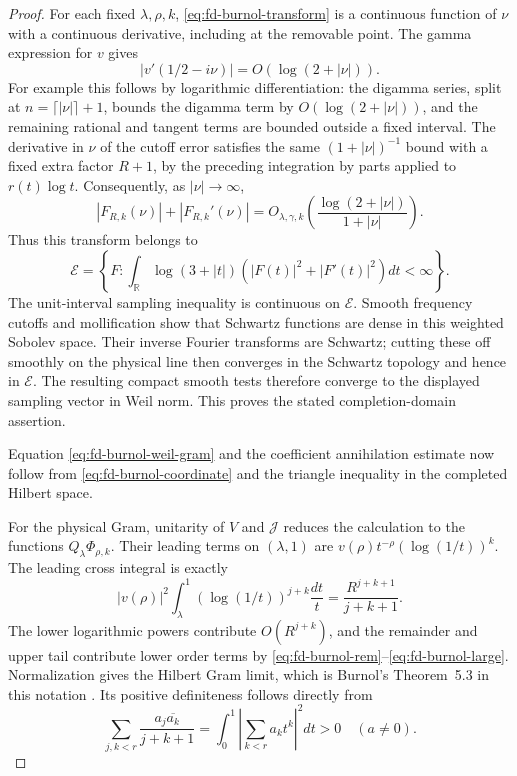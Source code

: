 \begin{proof}
For each fixed \(\lambda,\rho,k\),
\eqref{eq:fd-burnol-transform} is a continuous function of \(\nu\)
with a continuous derivative, including at the removable point.
The gamma expression for \(v\) gives
\[
 |v'(1/2-i\nu)|=O(\log(2+|\nu|)).
\]
For example this follows by logarithmic differentiation: the
digamma series, split at \(n=\lceil|\nu|\rceil+1\), bounds
the digamma term by \(O(\log(2+|\nu|))\), and the remaining
rational and tangent terms are bounded outside a fixed interval.
The derivative in \(\nu\) of the cutoff error satisfies the
same \((1+|\nu|)^{-1}\) bound with a fixed extra factor
\(R+1\), by the preceding integration by parts applied to
\(r(t)\log t\). Consequently, as \(|\nu|\to\infty\),
\[
 |F_{R,k}(\nu)|+|F_{R,k}'(\nu)|
       =O_{\lambda,\gamma,k}
          \left(\frac{\log(2+|\nu|)}{1+|\nu|}\right).
\]
Thus this transform belongs to
\[
 \mathcal E=\left\{F:\int_{\mathbb R}\log(3+|t|)
                    (|F(t)|^2+|F'(t)|^2)dt<\infty\right\}.
\]
The unit-interval sampling inequality is continuous on
\(\mathcal E\). Smooth frequency cutoffs and mollification show
that Schwartz functions are dense in this weighted Sobolev space.
Their inverse Fourier transforms are Schwartz; cutting these off
smoothly on the physical line then converges in the Schwartz
topology and hence in \(\mathcal E\). The resulting compact
smooth tests therefore converge to the displayed sampling vector
in Weil norm. This proves the stated completion-domain assertion.

Equation \eqref{eq:fd-burnol-weil-gram} and the coefficient
annihilation estimate now follow from
\eqref{eq:fd-burnol-coordinate} and the triangle inequality in
the completed Hilbert space.

For the physical Gram, unitarity of \(V\) and \(\mathcal J\)
reduces the calculation to the functions
\(Q_\lambda\Phi_{\rho,k}\). Their leading terms on
\((\lambda,1)\) are
\(v(\rho)t^{-\rho}(\log(1/t))^k\). The leading cross integral
is exactly
\[
 |v(\rho)|^2\int_\lambda^1
       (\log(1/t))^{j+k}\frac{dt}{t}
 =\frac{R^{j+k+1}}{j+k+1}.
\]
The lower logarithmic powers contribute
\(O(R^{j+k})\), and the remainder and upper tail contribute
lower order terms by
\eqref{eq:fd-burnol-rem}--\eqref{eq:fd-burnol-large}.
Normalization gives the Hilbert Gram limit, which is Burnol's
Theorem~5.3 in this notation \cite[p.~14]{burnol2002}.
Its positive definiteness follows directly from
\[
 \sum_{j,k<r}\frac{a_j\overline{a_k}}{j+k+1}
 =\int_0^1\left|\sum_{k<r}a_k t^k\right|^2dt>0
                         \quad(a\ne0).
\]
\end{proof}


